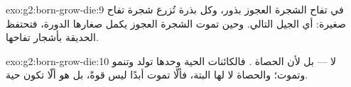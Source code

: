 \begin{solution}{exo:g2:born-grow-die:9}
في تفاح الشجرة العجوز بذور، وكل بذرة تُزرع شجرة تفاح صغيرة: أي
الجيل التالي. وحين تموت الشجرة العجوز يكمل صغارها الدورة، فتحتفظ
الحديقة بأشجار تفاحها.
\end{solution}

\begin{solution}{exo:g2:born-grow-die:10}
لا --- بل لأن الحصاة . فالكائنات الحية وحدها تولد
وتنمو وتموت؛ والحصاة لا  لها البتة، فألّا تموت أبدًا ليس
قوةً، بل هو ألّا تكون حية.
\end{solution}
